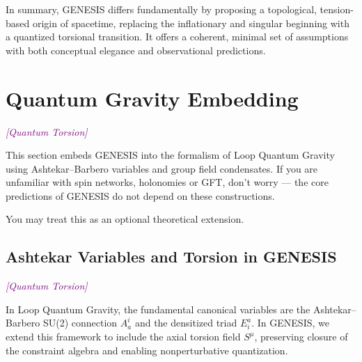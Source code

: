 \documentclass{article}
\newcommand{\quantumtag}{\textcolor{purple}{\textit{[Quantum Torsion]}}}
\begin{document}
In summary, GENESIS differs fundamentally by proposing a topological, tension-based origin of spacetime, replacing the inflationary and singular beginning with a quantized torsional transition. It offers a coherent, minimal set of assumptions with both conceptual elegance and observational predictions.

\medskip
\begin{center}
\end{center}
\medskip



\section{Quantum Gravity Embedding}
\label{sec:quantum-gravity}
\quantumtag

\begin{tcolorbox}[
    colback=white,
    colframe=yellow!75!black,
    title=Geometry meets loops,
    boxrule=0.4pt,
    arc=2mm,
    fonttitle=\bfseries,
    coltitle=black,
    left=4pt, right=4pt, top=4pt, bottom=4pt
]
This section embeds GENESIS into the formalism of Loop Quantum Gravity using Ashtekar–Barbero variables and group field condensates.  
If you are unfamiliar with spin networks, holonomies or GFT, don’t worry — the core predictions of GENESIS do not depend on these constructions.

You may treat this as an optional theoretical extension.
\end{tcolorbox}



\subsection{Ashtekar Variables and Torsion in GENESIS}
\quantumtag

In Loop Quantum Gravity, the fundamental canonical variables are the Ashtekar–Barbero SU(2) connection \( A^i_a \) and the densitized triad \( E^a_i \). In GENESIS, we extend this framework to include the axial torsion field \( S^\mu \), preserving closure of the constraint algebra and enabling nonperturbative quantization.
\end{document}
